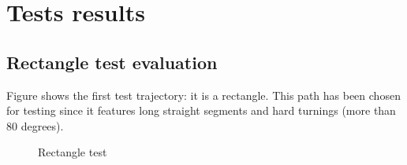 \section{Tests results}
\label{performance_evaluation:tests_result}


\subsection{Rectangle test evaluation}
\label{performance_evaluation:tests_result:rectangletest}

Figure  shows the first test trajectory:
it is a rectangle. This path has been chosen for testing since it
features long straight segments and hard turnings (more than 80
degrees).

\begin{figure}[!htp]
  \begin{center}

    \vspace*{30pt}
  \end{center}
  \caption{Rectangle test}
  \label{fig:rectangle}
\end{figure}

